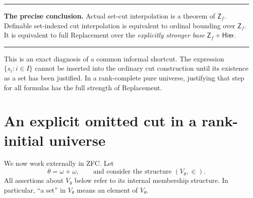 \documentclass[11pt,letterpaper]{article}
\theoremstyle{definition}
\theoremstyle{remark}
\newcommand{\Zf}{\mathsf{Z}_{\!f}}
\newcommand{\Hier}{\mathsf{Hier}}
\newenvironment{resultbox}{\par\medskip\noindent\begin{minipage}{\linewidth}\setlength{\parindent}{0pt}\hrule\medskip}{\medskip\hrule\end{minipage}\par\medskip}
\begin{document}
\begin{resultbox}
\textbf{The precise conclusion.} Actual set-cut interpolation is a theorem of $\Zf$. Definable set-indexed cut interpolation is equivalent to ordinal bounding over $\Zf$. It is equivalent to full Replacement over the \emph{explicitly stronger base} $\Zf+\Hier$.
\end{resultbox}

This is an exact diagnosis of a common informal shortcut. The expression $\{s_i:i\in I\}$ cannot be inserted into the ordinary cut construction until its existence as a set has been justified. In a rank-complete pure universe, justifying that step for all formulas has the full strength of Replacement.

\section{An explicit omitted cut in a rank-initial universe}
\label{hset:zr:sec:countermodel}

We now work externally in ZFC. Let
\[
\theta=\omega+\omega,\qquad\text{and consider the structure }(V_\theta,\in).
\]
All assertions about $V_\theta$ below refer to its internal membership structure. In particular, ``a set'' in $V_\theta$ means an element of $V_\theta$.
\end{document}
